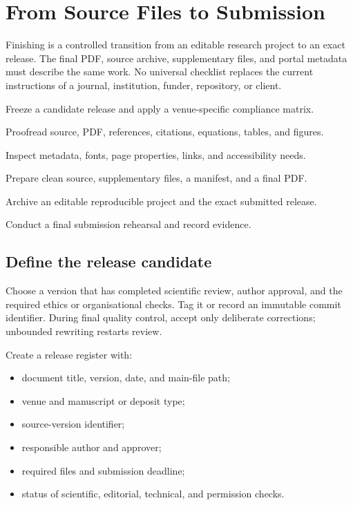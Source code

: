 \chapter{From Source Files to Submission}
\label{chap:submission}

Finishing is a controlled transition from an editable research project to an
exact release. The final PDF, source archive, supplementary files, and portal
metadata must describe the same work. No universal checklist replaces the
current instructions of a journal, institution, funder, repository, or client.

\begin{learningoutcomes}
  \item Freeze a candidate release and apply a venue-specific compliance matrix.
  \item Proofread source, PDF, references, citations, equations, tables, and figures.
  \item Inspect metadata, fonts, page properties, links, and accessibility needs.
  \item Prepare clean source, supplementary files, a manifest, and a final PDF.
  \item Archive an editable reproducible project and the exact submitted release.
  \item Conduct a final submission rehearsal and record evidence.
\end{learningoutcomes}

\section{Define the release candidate}

Choose a version that has completed scientific review, author approval, and the
required ethics or organisational checks. Tag it or record an immutable commit
identifier. During final quality control, accept only deliberate corrections;
unbounded rewriting restarts review.

Create a release register with:

\begin{itemize}
  \item document title, version, date, and main-file path;
  \item venue and manuscript or deposit type;
  \item source-version identifier;
  \item responsible author and approver;
  \item required files and submission deadline;
  \item status of scientific, editorial, technical, and permission checks.
\end{itemize}

